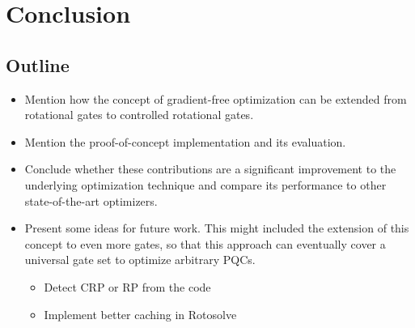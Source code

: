 \chapter{Conclusion}
\label{chap:conclusion}

\section{Outline}
\begin{itemize}
    \item
        Mention how the concept of gradient-free optimization can be
        extended from rotational gates to controlled rotational gates.
    \item
        Mention the proof-of-concept implementation and its evaluation.
    \item
        Conclude whether these contributions are a
        significant improvement to the underlying optimization technique
        and compare its performance to other state-of-the-art optimizers.
    \item
        Present some ideas for future work.
        This might included the extension of this concept to even more
        gates, so that this approach can eventually cover a universal gate
        set to optimize arbitrary PQCs.
        \begin{itemize}
            \item Detect CRP or RP from the code
            \item Implement better caching in Rotosolve
        \end{itemize}
\end{itemize}
